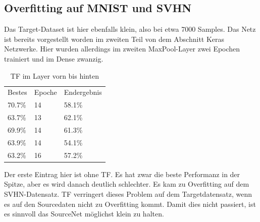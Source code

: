 \subsection{Overfitting auf MNIST und SVHN}
    Das Target-Dataset ist hier ebenfalls klein, also bei etwa 7000 Samples. 
    Das Netz ist bereits vorgestellt worden im zweiten Teil von dem 
    Abschnitt Keras Netzwerke. Hier wurden allerdings im zweiten MaxPool-Layer 
    zwei Epochen trainiert und im Dense zwanzig. 
    \begin{table}[h!]
        \begin{center}
            \caption{TF im Layer vorn bis hinten}
            \label{tab5:Table}
            \begin{tabular}{l|l|l}
                Bestes & Epoche & Endergebnis \\
                70.7\% & 14 & 58.1\% \\
                63.7\% & 13 & 62.1\% \\
                69.9\% & 14 & 61.3\% \\
                63.9\% & 14 & 54.1\% \\
                63.2\% & 16 & 57.2\% \\
            \end{tabular}
        \end{center}
    \end{table}
    Der erste Eintrag hier ist ohne TF. Es hat zwar die beste Performanz in der Spitze, 
    aber es wird danach deutlich schlechter. Es kam zu Overfitting auf dem SVHN-Datensatz. 
    TF verringert dieses Problem auf dem Targetdatensatz, wenn es auf 
    den Sourcedaten nicht zu Overfitting kommt. Damit dies nicht passiert, ist es sinnvoll das 
    SourceNet möglichst klein zu halten. 

